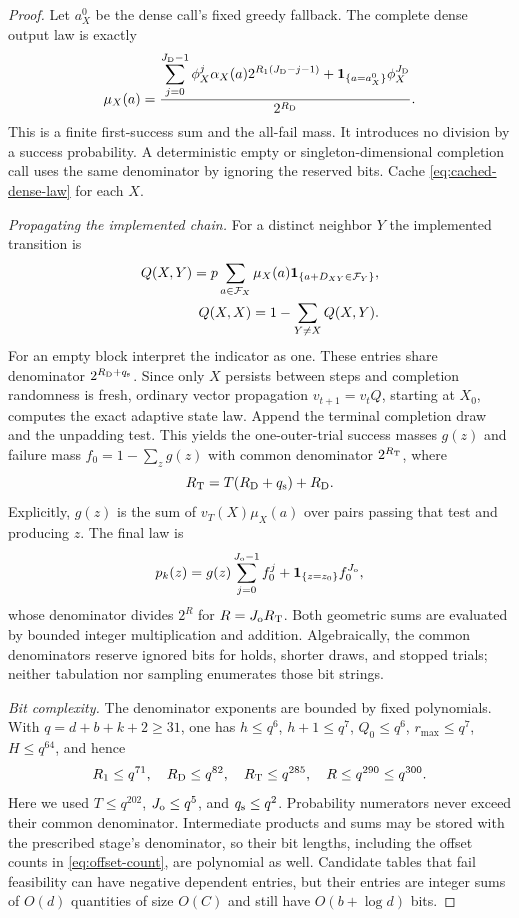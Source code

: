 \begin{proof}
Let $a_X^0$ be the dense call's fixed greedy fallback. The complete dense
output law is exactly
\begin{equation}\label{eq:cached-dense-law}
 \mu_X(a)=\frac{
 \displaystyle\sum_{j=0}^{J_{\rm D}-1}
    \phi_X^j\alpha_X(a)2^{R_1(J_{\rm D}-j-1)}
    +\mathbf{1}_{\{a=a_X^0\}}\phi_X^{J_{\rm D}}
 }{2^{R_{\rm D}}}.
\end{equation}
This is a finite first-success sum and the all-fail mass. It introduces
no division by a success probability. A deterministic empty or
singleton-dimensional completion call uses the same denominator by
ignoring the reserved bits. Cache \eqref{eq:cached-dense-law} for each $X$.

\emph{Propagating the implemented chain.}
For a distinct neighbor $Y$ the implemented transition is
\begin{equation}\label{eq:implemented-kernel}
 \begin{aligned}
 Q(X,Y)=p\sum_{a\in\mathcal F_X}\mu_X(a)
                \mathbf{1}_{\{a+D_{XY}\in\mathcal F_Y\}},\\
 Q(X,X)=1-\sum_{Y\ne X}Q(X,Y).
 \end{aligned}
\end{equation}
For an empty block interpret the indicator as one. These entries share
denominator $2^{R_{\rm D}+q_{\rm s}}$. Since only $X$ persists between
steps and completion randomness is fresh, ordinary vector propagation
$v_{t+1}=v_tQ$, starting at $X_0$, computes the exact adaptive state law.
Append the terminal completion draw and the unpadding test. This yields
the one-outer-trial success masses $g(z)$ and failure mass
$f_0=1-\sum_z g(z)$ with common denominator $2^{R_{\rm T}}$, where
\[
 R_{\rm T}=T(R_{\rm D}+q_{\rm s})+R_{\rm D}.
\]
Explicitly, $g(z)$ is the sum of $v_T(X)\mu_X(a)$ over pairs passing that
test and producing $z$. The final law is
\begin{equation}\label{eq:outer-geometric-law}
 p_k(z)=g(z)\sum_{j=0}^{J_{\rm o}-1}f_0^j
                 +\mathbf{1}_{\{z=z_0\}}f_0^{J_{\rm o}},
\end{equation}
whose denominator divides $2^R$ for $R=J_{\rm o}R_{\rm T}$.
Both geometric sums are evaluated by bounded integer multiplication and
addition. Algebraically, the common denominators reserve ignored bits for
holds, shorter draws, and stopped trials; neither tabulation nor sampling
enumerates those bit strings.

\emph{Bit complexity.}
The denominator exponents are bounded by fixed polynomials. With
$q=d+b+k+2\ge31$, one has $h\le q^6$, $h+1\le q^7$,
$Q_0\le q^6$, $r_{\max}\le q^7$, $H\le q^{64}$, and hence
\[
 R_1\le q^{71},\quad R_{\rm D}\le q^{82},\quad
 R_{\rm T}\le q^{285},\quad R\le q^{290}\le q^{300}.
\]
Here we used $T\le q^{202}$, $J_{\rm o}\le q^5$, and
$q_{\rm s}\le q^2$. Probability numerators never exceed their common
denominator. Intermediate products and sums may be stored with the
prescribed stage's denominator, so their bit lengths, including the
offset counts in \eqref{eq:offset-count}, are polynomial as well.
Candidate tables that fail feasibility can have negative dependent
entries, but their entries are integer sums of $O(d)$ quantities of size
$O(C)$ and still have $O(b+\log d)$ bits.


\end{proof}
